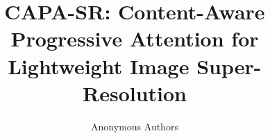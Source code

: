 \documentclass[10pt,twocolumn,letterpaper]{article}
\title{CAPA-SR: Content-Aware Progressive Attention for Lightweight Image Super-Resolution}
\author{Anonymous Authors}
\begin{document}
\maketitle

\begin{abstract}

\end{abstract}







\appendix


{\small


}
\end{document}
